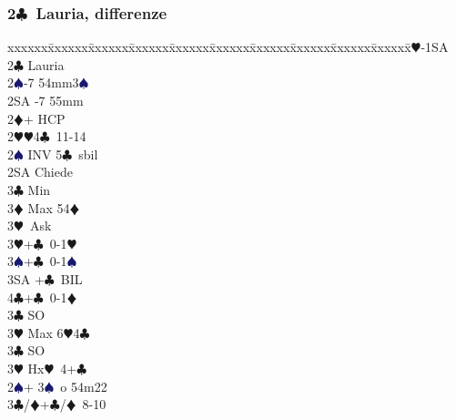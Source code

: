 \documentclass[a4paper,italian]{article}
\newcommand{\BC}{\textcolor{OliveGreen}{$\clubsuit$}}
\newcommand{\BD}{\textcolor{RedOrange}{$\vardiamondsuit$}}
\newcommand{\BH}{\textcolor{Red2}{$\varheartsuit${}}}
\newcommand{\BS}{\textcolor{MidnightBlue}{$\spadesuit${}}}
\newcommand{\pdfc}{\texorpdfstring{\BC{}}{C}}
\newenvironment{bidtable}
{\begin{tabbing}

    xxxxxx\=xxxxxx\=xxxxxx\=xxxxxx\=xxxxxx\=xxxxxx\=xxxxxx\=xxxxxx\=xxxxxx\=xxxxxx\=\kill}
{\end{tabbing} }%
\begin{document}
                                    \begin{multicols}{2}
                                        \subsubsection{2\pdfc\ Lauria, differenze}\label{Lauriadiff}
                                        \begin{bidtable}
                                            1\BH-1SA\+\\
                                            2\BC \> Lauria\+\\
                                            2\BS {}-7 54mm3\BS \\
                                            2SA -7 55mm\\
                                            2\BD {}+ HCP\+\\
                                            2\BH {}\BH 4\BC\ 11-14\+\\
                                            2\BS \> INV 5\BC\ sbil\+\\
                                            2SA \> Chiede\+\\
                                            3\BC \> Min\\
                                            3\BD \> Max 54\BD\+\\
                                            3\BH\ Ask\-\\
                                            3\BH {}+\BC\ 0-1\BH\\
                                            3\BS {}+\BC\ 0-1\BS\\
                                            3SA +\BC\ BIL\\
                                            4\BC {}+\BC\ 0-1\BD\-\\
                                            3\BC \> SO\\
                                            3\BH \> Max 6\BH4\BC\-\\
                                            3\BC \> SO\\
                                            3\BH \> Hx\BH\ 4+\BC \-\\
                                            2\BS {}+ 3\BS\ o 54m22\+\\
                                            3\BC/\BD {}+\BC /\BD\ 8-10\\

\end{bidtable}
\end{multicols}
\end{document}
